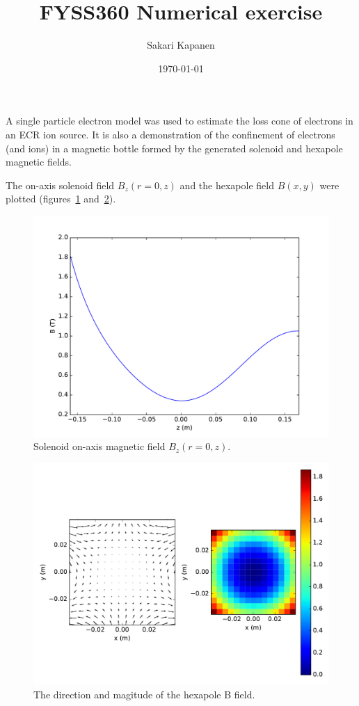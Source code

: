 \documentclass[11pt, a4paper]{article}
\begin{document}
\title{FYSS360 Numerical exercise}
\author{Sakari Kapanen}
\date{\today}
\maketitle

A single particle electron model was used to estimate the loss cone of electrons in an ECR ion source. It is also a demonstration of the confinement of electrons (and ions) in a magnetic bottle formed by the generated solenoid and hexapole magnetic fields.

The on-axis solenoid field $B_z(r=0, z)$ and the hexapole field $B(x, y)$ were plotted (figures~\ref{fig:solenoidb} and~\ref{fig:hexapoleb}).
\begin{figure}
    \centering
    \includegraphics[width=\textwidth]{output/solenoid_B_onaxis.pdf}
    \caption{Solenoid on-axis magnetic field $B_z(r=0, z)$.}
    \label{fig:solenoidb}
\end{figure}
\begin{figure}
    \centering
    \includegraphics[width=\textwidth]{output/hexapole_B.pdf}
    \caption{The direction and magitude of the hexapole B field.}
    \label{fig:hexapoleb}
\end{figure}
\end{document}
